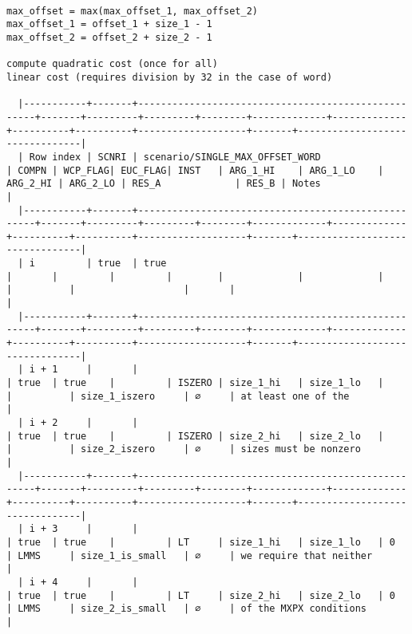 \documentclass[varwidth=\maxdimen,margin=0.5cm,multi={verbatim}]{standalone}
\begin{document}
\begin{verbatim}

max_offset = max(max_offset_1, max_offset_2)  
max_offset_1 = offset_1 + size_1 - 1
max_offset_2 = offset_2 + size_2 - 1

compute quadratic cost (once for all)
linear cost (requires division by 32 in the case of word)

  |-----------+-------+----------------------------------------------------+-------+---------+---------+--------+-------------+-------------+----------+----------+-------------------+-------+--------------------------------|
  | Row index | SCNRI | scenario/SINGLE_MAX_OFFSET_WORD                    | COMPN | WCP_FLAG| EUC_FLAG| INST   | ARG_1_HI    | ARG_1_LO    | ARG_2_HI | ARG_2_LO | RES_A             | RES_B | Notes                          |
  |-----------+-------+----------------------------------------------------+-------+---------+---------+--------+-------------+-------------+----------+----------+-------------------+-------+--------------------------------|
  | i         | true  | true                                               |       |         |         |        |             |             |          |          |                   |       |                                |
  |-----------+-------+----------------------------------------------------+-------+---------+---------+--------+-------------+-------------+----------+----------+-------------------+-------+--------------------------------|
  | i + 1     |       |                                                    | true  | true    |         | ISZERO | size_1_hi   | size_1_lo   |          |          | size_1_iszero     | ∅     | at least one of the            |
  | i + 2     |       |                                                    | true  | true    |         | ISZERO | size_2_hi   | size_2_lo   |          |          | size_2_iszero     | ∅     | sizes must be nonzero          |
  |-----------+-------+----------------------------------------------------+-------+---------+---------+--------+-------------+-------------+----------+----------+-------------------+-------+--------------------------------|
  | i + 3     |       |                                                    | true  | true    |         | LT     | size_1_hi   | size_1_lo   | 0        | LMMS     | size_1_is_small   | ∅     | we require that neither        |
  | i + 4     |       |                                                    | true  | true    |         | LT     | size_2_hi   | size_2_lo   | 0        | LMMS     | size_2_is_small   | ∅     | of the MXPX conditions         |

\end{verbatim}
\end{document}
